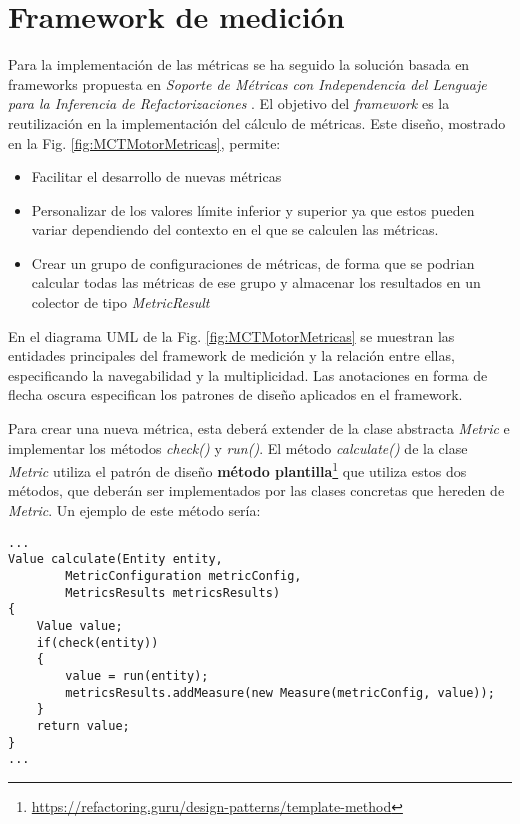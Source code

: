 \section{Framework de medición} 
Para la implementación de las métricas se ha seguido la solución basada en frameworks propuesta en \textit{Soporte de Métricas con Independencia del Lenguaje para la Inferencia de Refactorizaciones} \cite{marticorena_soporte_2005}. El objetivo del \textit{framework} es la reutilización en la implementación del cálculo de métricas. Este diseño, mostrado en la Fig. \ref{fig:MCTMotorMetricas}, permite:
\begin{itemize}
	\tightlist
	\item Facilitar el desarrollo de nuevas métricas
	\item Personalizar de los valores límite inferior y superior ya que estos pueden variar dependiendo del contexto en el que se calculen las métricas.
	\item Crear un grupo de configuraciones de métricas, de forma que se podrian calcular todas las métricas de ese grupo y almacenar los resultados en un colector de tipo \textit{MetricResult}
\end{itemize}

En el diagrama UML de la Fig. \ref{fig:MCTMotorMetricas} se muestran las entidades principales del framework de medición y la relación entre ellas, especificando la navegabilidad y la multiplicidad. Las anotaciones en forma de flecha oscura especifican los patrones de diseño\citep{gamma_patrones_2002} aplicados en el framework.

Para crear una nueva métrica, esta deberá extender de la clase abstracta \textit{Metric} e implementar los métodos \textit{check()} y \textit{run()}. El método \textit{calculate()} de la clase \textit{Metric} utiliza el patrón de diseño \textbf{método plantilla}\footnote{\url{https://refactoring.guru/design-patterns/template-method}} que utiliza estos dos métodos, que deberán ser implementados por las clases concretas que hereden de \textit{Metric}. Un ejemplo de este método sería:
\begin{lstlisting}
...
Value calculate(Entity entity, 
		MetricConfiguration metricConfig, 
		MetricsResults metricsResults) 
{
	Value value;
	if(check(entity))
	{
		value = run(entity);
		metricsResults.addMeasure(new Measure(metricConfig, value));
	}
	return value;
}
...
\end{lstlisting}

